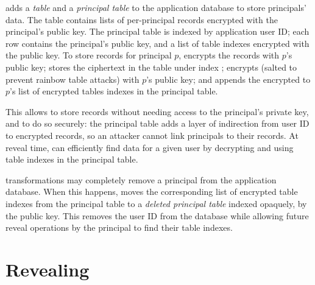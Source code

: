 \sys adds a \emph{\xx table} and a \emph{principal table} to the application
database to store principals' \xxed data.
%
The \xx table contains lists of per-principal \xx records encrypted with the
principal's public key.
%
%
The principal table is indexed by application user ID; each row contains the
principal's public key, and a list of \xx table indexes encrypted with the
public key.
%
To store \xx records for principal $p$, \sys \one{} encrypts the records with
$p$'s public key; \two{} stores the ciphertext in the \xx table under index
; \three{} encrypts  (salted to
prevent rainbow table attacks) with $p$'s public key; and \four{} appends the
encrypted  to $p$'s list of encrypted \xx tables indexes
in the principal table.

%
This allows \sys to store records without needing access to the principal's
private key, and to do so securely: the principal table adds a layer of
indirection from user ID to encrypted \xx records, so an attacker cannot link
principals to their records.
%
At reveal time, \sys can efficiently find \xxed data for a given user
by decrypting and using \xx table indexes in the principal table.
%
%

%
\Xxing transformations may completely remove a principal from the
application database.
%
When this happens, \sys moves the corresponding list of encrypted \xx table
indexes from the principal table to a \emph{deleted principal table} indexed
opaquely, \eg by the public key.
%
This removes the user ID from the database while allowing future reveal
operations by the principal to find their \xx table indexes.
%

\section{Revealing}
\label{s:reveal}

